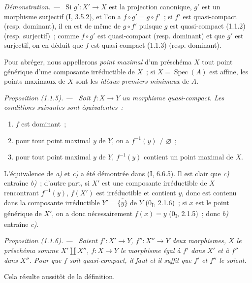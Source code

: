 \documentclass[10pt,oneside]{book}
\makeatletter
\newcommand{\setmanualcurrentlabel}[1]{\def\@currentlabel{#1}}
\newcommand{\oldpage}[2][]{%
  \setcounter{footnote}{0}%
  \marginpar{\scriptsize\textbf{#1}~|~#2}\ignorespaces}
\newenvironment{proposition}[1][]{%
  \setmanualcurrentlabel{#1}\par\medskip\noindent\itshape Proposition (#1). ---\ }{\par}
\newenvironment{proof}{%
  \par\medskip\noindent\textit{Démonstration. ---\ }}{\par}
\makeatother
\begin{document}
\begin{proof}
Si $g':X'\to X$ est la projection canonique, $g'$ est un morphisme surjectif
(I, 3.5.2), et l'on a $f\circ g'=g\circ f'$~; si $f'$ est quasi-compact
(resp. dominant), il en est de même de $g\circ f'$ puisque $g$ est
quasi-compact (1.1.2) (resp. surjectif)~; comme $f\circ g'$ est quasi-compact
(resp. dominant) et que $g'$ est surjectif, on en déduit que $f$ est
quasi-compact (1.1.3) (resp. dominant).
\end{proof}

\oldpage[IV-1]{226}

Pour abréger, nous appellerons \emph{point maximal} d'un préschéma $X$ tout
point générique d'une composante irréductible de $X$~; si
$X=\operatorname{Spec}(A)$ est affine, les points maximaux de $X$ sont les
\emph{idéaux premiers minimaux} de $A$.

\begin{proposition}[1.1.5]
\label{IV.1.1.5-fr}
Soit $f:X\to Y$ un morphisme quasi-compact. Les conditions suivantes sont
équivalentes~:
\begin{enumerate}
  \item[a)] $f$ est dominant~;
  \item[b)] pour tout point maximal $y$ de $Y$, on a
  $f^{-1}(y)\neq\varnothing$~;
  \item[c)] pour tout point maximal $y$ de $Y$, $f^{-1}(y)$ contient un point
  maximal de $X$.
\end{enumerate}
\end{proposition}

L'équivalence de \emph{a)} et \emph{c)} a été démontrée dans (I, 6.6.5). Il
est clair que \emph{c)} entraîne \emph{b)}~; d'autre part, si $X'$ est une
composante irréductible de $X$ rencontrant $f^{-1}(y)$, $f(X')$ est
irréductible et contient $y$, donc est contenu dans la composante irréductible
$Y'=\overline{\{y\}}$ de $Y$ (0\textsubscript{I}, 2.1.6)~; si $x$ est le
point générique de $X'$, on a donc nécessairement $f(x)=y$
(0\textsubscript{I}, 2.1.5)~; donc \emph{b)} entraîne \emph{c)}.

\begin{proposition}[1.1.6]
\label{IV.1.1.6-fr}
Soient $f':X'\to Y$, $f'':X''\to Y$ deux morphismes, $X$ le préschéma somme
$X'\coprod X''$, $f:X\to Y$ le morphisme égal à $f'$ dans $X'$ et à $f''$
dans $X''$. Pour que $f$ soit quasi-compact, il faut et il suffit que $f'$ et
$f''$ le soient.
\end{proposition}

Cela résulte aussitôt de la définition.
\end{document}
